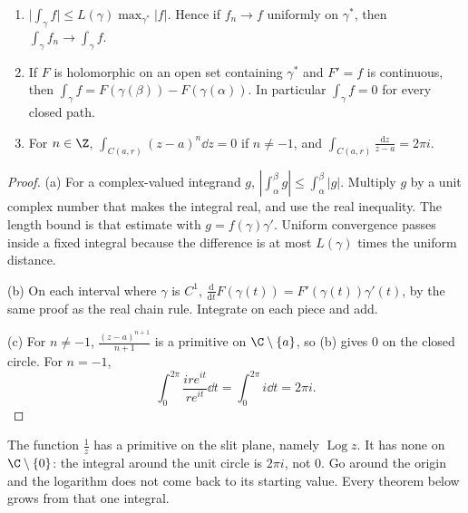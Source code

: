 \begin{proposition}\label{prop:pathint}
\begin{enumerate}[label=(\alph*)]
\item $\bigl|\int_\gamma f\bigr|\le L(\gamma)\max_{\gamma^*}|f|$. Hence if $f_n\to f$ uniformly on $\gamma^*$, then $\int_\gamma f_n\to\int_\gamma f$.
\item If $F$ is holomorphic on an open set containing $\gamma^*$ and $F'=f$ is continuous, then $\int_\gamma f=F(\gamma(\beta))-F(\gamma(\alpha))$. In
particular $\int_\gamma f=0$ for every closed path.
\item For $n\in\Z$, $\displaystyle\int_{C(a,r)}(z-a)^n\dd z=0$ if $n\ne-1$, and $\displaystyle\int_{C(a,r)}\frac{\mathrm dz}{z-a}=2\pi i$.
\end{enumerate}
\end{proposition}
\begin{proof}
(a) For a complex-valued integrand $g$, $|\int_\alpha^\beta g|\le\int_\alpha^\beta|g|$. Multiply $g$ by a unit complex number that makes the integral real, and use the real inequality. The length bound is that estimate with $g=f(\gamma)\gamma'$. Uniform convergence passes inside a fixed integral because the difference is at most $L(\gamma)$ times the uniform distance.

(b) On each interval where $\gamma$ is $C^1$, $\frac{\mathrm d}{\mathrm dt}F(\gamma(t))=F'(\gamma(t))\gamma'(t)$, by the same proof as the real chain rule. Integrate on each piece and add.

(c) For $n\ne-1$, $\frac{(z-a)^{n+1}}{n+1}$ is a primitive on $\C\setminus\{a\}$, so (b) gives $0$ on the closed circle. For $n=-1$,
\[
\int_0^{2\pi}\frac{ire^{it}}{re^{it}}\dd t=\int_0^{2\pi}i\dd t=2\pi i.
\]
\end{proof}

The function $\frac1z$ has a primitive on the slit plane, namely $\operatorname{Log}z$. It has none on $\C\setminus\{0\}$: the integral around the unit circle is $2\pi i$, not $0$. Go around the origin and the logarithm does not come back to its starting value. Every theorem below grows from that one integral.

